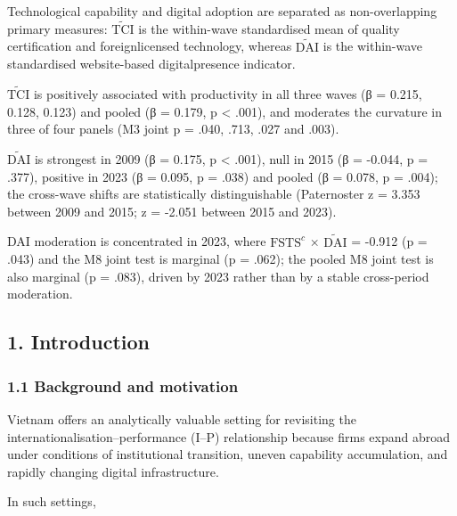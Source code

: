 \documentclass[12pt,a4paper]{article}
\begin{document}
Technological capability and digital adoption are separated as
non-overlapping primary measures: \(\tilde{\mathrm{TCI}}\) is the
within-wave standardised mean of quality certification and
foreignlicensed technology, whereas \(\tilde{\mathrm{DAI}}\) is the
within-wave standardised website-based digitalpresence indicator.

\(\tilde{\mathrm{TCI}}\) is positively associated with productivity in
all three waves (β = 0.215, 0.128, 0.123) and pooled (β = 0.179, p
\textless{} .001), and moderates the curvature in three of four panels
(M3 joint p = .040, .713, .027 and .003).

\(\tilde{\mathrm{DAI}}\) is strongest in 2009 (β = 0.175, p \textless{}
.001), null in 2015 (β = -0.044, p = .377), positive in 2023 (β = 0.095,
p = .038) and pooled (β = 0.078, p = .004); the cross-wave shifts are
statistically distinguishable (Paternoster z = 3.353 between 2009 and
2015; z = -2.051 between 2015 and 2023).

DAI moderation is concentrated in 2023, where \(\mathrm{FSTS}^{c}\) ×
\(\tilde{\mathrm{DAI}}\) = -0.912 (p = .043) and the M8 joint test is
marginal (p = .062); the pooled M8 joint test is also marginal (p =
.083), driven by 2023 rather than by a stable cross-period moderation.

\hypertarget{1-introduction}{%
\subsection{1. Introduction}\label{1-introduction}}

\hypertarget{11-background-and-motivation}{%
\subsubsection{1.1 Background and
motivation}\label{11-background-and-motivation}}

Vietnam offers an analytically valuable setting for revisiting the
internationalisation--performance (I--P) relationship because firms
expand abroad under conditions of institutional transition, uneven
capability accumulation, and rapidly changing digital infrastructure.

In such settings,
\end{document}
